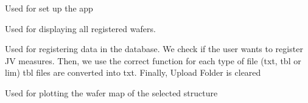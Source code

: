 \documentclass[letterpaper,10pt,english]{sphinxmanual}
\begin{document}

\begin{fulllineitems}
\label{\detokenize{app:app.index}}
\pysigstartsignatures
{}
\pysigstopsignatures
\sphinxAtStartPar
Used for set up the app

\end{fulllineitems}


\begin{fulllineitems}
\label{\detokenize{app:app.open}}
\pysigstartsignatures
{}
\pysigstopsignatures
\sphinxAtStartPar
Used for displaying all registered wafers.

\end{fulllineitems}


\begin{fulllineitems}
\label{\detokenize{app:app.options}}
\pysigstartsignatures
{}
\pysigstopsignatures
\sphinxAtStartPar
Used for registering data in the database. We check if the user wants to register J\sphinxhyphen{}V measures.
Then, we use the correct function for each type of file (txt, tbl or lim)
tbl files are converted into txt.
Finally, Upload Folder is cleared

\end{fulllineitems}


\begin{fulllineitems}
\label{\detokenize{app:app.personal_wafer_map}}
\pysigstartsignatures
{}
\pysigstopsignatures
\sphinxAtStartPar
Used for plotting the wafer map of the selected structure

\end{fulllineitems}
\end{document}
